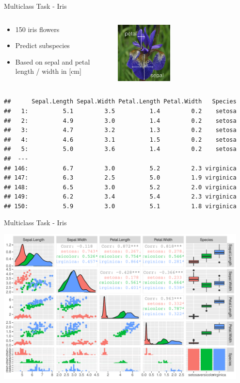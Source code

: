 \documentclass[11pt,compress,t,notes=noshow, xcolor=table]{beamer}
\begin{document}
\begin{vbframe}{Multiclass Task - Iris}

\begin{columns}[T]
\begin{column}{0.5\textwidth}
\begin{itemize}
\item 150 iris flowers
\item Predict subspecies
\item Based on sepal and petal length / width in [cm]
\end{itemize}
\end{column}
\begin{column}{0.5\textwidth}
\includegraphics[width=0.4\textwidth]{figure_man/iris_petal_sepal.png}
\end{column}
\end{columns}
{\scriptsize
\begin{verbatim}
##      Sepal.Length Sepal.Width Petal.Length Petal.Width   Species
##   1:          5.1         3.5          1.4         0.2    setosa
##   2:          4.9         3.0          1.4         0.2    setosa
##   3:          4.7         3.2          1.3         0.2    setosa
##   4:          4.6         3.1          1.5         0.2    setosa
##   5:          5.0         3.6          1.4         0.2    setosa
##  ---
## 146:          6.7         3.0          5.2         2.3 virginica
## 147:          6.3         2.5          5.0         1.9 virginica
## 148:          6.5         3.0          5.2         2.0 virginica
## 149:          6.2         3.4          5.4         2.3 virginica
## 150:          5.9         3.0          5.1         1.8 virginica
\end{verbatim}
}
\end{vbframe}

\begin{vbframe}{Multiclass Task - Iris}
\scriptsize
{}\color{fgcolor}

{\centering \includegraphics[width=0.95\textwidth]{figure/reg_class_task_3}

}


\end{vbframe}


\endlecture
\end{document}
